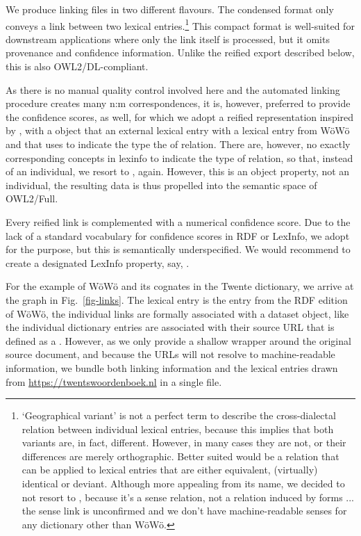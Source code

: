 We produce linking files in two different flavours. The condensed format only conveys a  link between two lexical entries.\footnote{
    `Geographical variant' is not a perfect term to describe the cross-dialectal relation between individual lexical entries, because this implies that both variants are, in fact, different. However, in many cases they are not, or their differences are merely orthographic. Better suited would be a relation that can be applied to lexical entries that are either equivalent, (virtually) identical or deviant. 
    Although more appealing from its name, we decided to not resort to , because it's a sense relation, not a relation induced by forms ... the sense link is unconfirmed and we don't have machine-readable senses for any dictionary other than WöWö.
}
This compact format is well-suited for downstream applications where only the link itself is processed, but it omits provenance and confidence information. Unlike the reified export described below, this is also OWL2/DL-compliant. 

As there is no manual quality control involved here and the automated linking procedure creates many n:m correspondences, it is, however, preferred to provide the confidence scores, as well, for which we adopt a reified representation inspired by \citet{gillis2023refinement}, with a  object that  an external lexical entry with a lexical entry from WöWö and that uses  to indicate the type the of relation. There are, however, no exactly corresponding concepts in lexinfo to indicate the type of relation, so that, instead of an individual, we resort to , again. However, this is an object property, not an individual, the resulting data is thus propelled into the semantic space of OWL2/Full.

Every reified link is complemented with a numerical confidence score. Due to the lack of a standard vocabulary for confidence scores in RDF or LexInfo, we adopt  for the purpose, but this is semantically underspecified. We would recommend to create a designated LexInfo property, say, .

For the example of WöWö  and its cognates in the Twente dictionary, we arrive at the graph in Fig.\ \ref{fig-links}. The lexical entry  is the entry from the RDF edition of WöWö, the individual links are formally associated with a dataset object, like the individual dictionary entries are associated with their source URL that is defined as a . However, as we only provide a shallow wrapper around the original source document, and because the URLs will not resolve to machine-readable information, we bundle both linking information and the lexical entries drawn from \url{https://twentswoordenboek.nl} in a single file.

